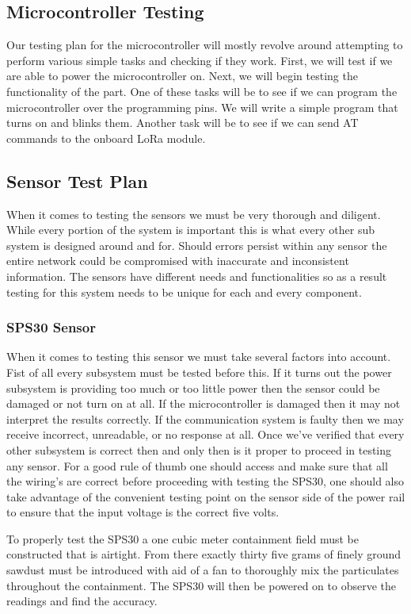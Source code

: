 \subsection{Microcontroller Testing}
Our testing plan for the microcontroller will mostly revolve around attempting to perform various simple tasks and checking if they work. First, we will test if we are able to power the microcontroller on. Next, we will begin testing the functionality of the part. One of these tasks will be to see if we can program the microcontroller over the programming pins. We will write a simple program that turns on and blinks them. Another task will be to see if we can send AT commands to the onboard LoRa module.

\subsection{Sensor Test Plan}
When it comes to testing the sensors we must be very thorough and diligent. While every portion of the system is important this is what every other sub system is designed around and for. Should errors persist within any sensor the entire network could be compromised with inaccurate and inconsistent information. The sensors have different needs and functionalities so as a result testing for this system needs to be unique for each and every component.

\subsubsection{SPS30 Sensor}
When it comes to testing this sensor we must take several factors into account. Fist of all every subsystem must be tested before this. If it turns out the power subsystem is providing too much or too little power then the sensor could be damaged or not turn on at all. If the microcontroller is damaged then it may not interpret the results correctly. If the communication system is faulty then we may receive incorrect, unreadable, or no response at all. Once we've verified that every other subsystem is correct then and only then is it proper to proceed in testing any sensor.
For a good rule of thumb one should access and make sure that all the wiring's are correct before proceeding with testing the SPS30, one should also take advantage of the convenient testing point on the sensor side of the power rail to ensure that the input voltage is the correct five volts.

To properly test the SPS30 a one cubic meter containment field must be constructed that is airtight. From there exactly thirty five grams of finely ground sawdust must be introduced with aid of a fan to thoroughly mix the particulates throughout the containment. The SPS30 will then be powered on to observe the readings and find the accuracy.

